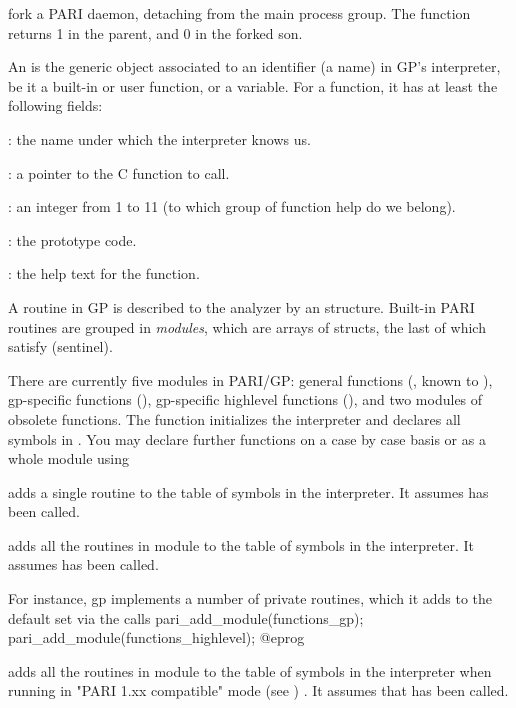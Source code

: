  fork a PARI daemon, detaching from the main
process group. The function returns 1 in the parent, and 0 in the
forked son.


An  is the generic object associated to an identifier (a name)
in GP's interpreter, be it a built-in or user function, or a variable. For
a function, it has at least the following fields:

   : the name under which the interpreter knows us.

   :  a pointer to the C function to call.

   : an integer from 1 to 11 (to which group of function
                    help do we belong).

   : the prototype code.

   : the help text for the function.

A routine in GP is described to the analyzer by an 
structure. Built-in PARI routines are grouped in \emph{modules}, which
are arrays of  structs, the last of which satisfy
 (sentinel).

There are currently five modules in PARI/GP: general functions
(, known to ), gp-specific functions
(), gp-specific highlevel functions
(), and two modules of obsolete functions. The
function  initializes the interpreter and declares all
symbols in . You may declare further functions on a
case by case basis or as a whole module using

 adds a single routine to the
table of symbols in the interpreter. It assumes  has been
called.

 adds all the routines in module
 to the table of symbols in the interpreter. It assumes
 has been called.

\noindent For instance, gp implements a number of private routines, which
it adds to the default set via the calls
\bprog
  pari_add_module(functions_gp);
  pari_add_module(functions_highlevel);
@eprog

 adds all the routines in module
 to the table of symbols in the interpreter when running in
"PARI 1.xx compatible" mode (see ) . It assumes
that
 has been called.


